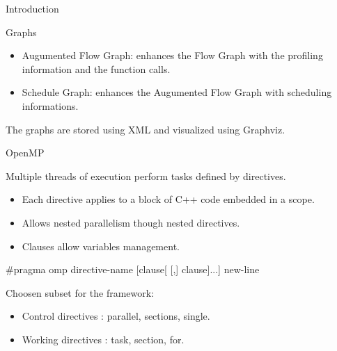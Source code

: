 \documentclass[xcolor=dvipsnames]{beamer}
\begin{document}
\begin{section}{Introduction}
\begin{frame}{\hskip 0.3cm Graphs}
\begin{itemize}
\item Augumented Flow Graph: enhances the Flow Graph with the profiling information and the function calls.

\item Schedule Graph: enhances the Augumented Flow Graph with scheduling informations.


\end{itemize}			

The graphs are stored using XML and visualized using Graphviz.



\end{frame}








\begin{frame}{\hskip 0.3cm OpenMP }

Multiple threads of execution perform tasks defined by directives.

\begin{itemize}
\item Each directive applies to  a block of C++ code embedded in a scope.

\item Allows nested parallelism though nested directives.

\item Clauses allow variables management.
\end{itemize}

\begin{block}

$\#$pragma omp directive-name [clause[ [,] clause]...] new-line

\end{block}

Choosen subset for the framework:

\begin{itemize}

\item Control directives : parallel, sections, single.

\item Working directives : task, section, for.

\end{itemize}

\end{frame}













\end{section}
\end{document}
